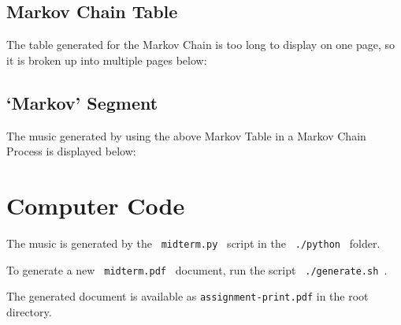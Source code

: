 \documentclass[10pt,letterpaper]{article}
\newcommand{\code}[1]{\colorbox{light-gray}{\texttt{#1}}}
\begin{document}


\subsection*{Markov Chain Table}
The table generated for the Markov Chain is too long to display on one page,
so it is broken up into multiple pages below:

\vspace*{24pt}







\restoregeometry{}

\subsection*{`Markov' Segment}
The music generated by using the above Markov Table in a Markov Chain Process
is displayed below:

\begin{quote}
{%
\parindent 0pt
\noindent
\ifx\preLilyPondExample \undefined
\else
  \expandafter\preLilyPondExample
\fi
%
\ifx\postLilyPondExample \undefined
\else
  \expandafter\postLilyPondExample
\fi
}
\end{quote}

\clearpage{}

\section*{Computer Code}
The music is generated by the \code{ midterm.py } script in the
\code{ ./python } folder.

To generate a new \code{ midterm.pdf } document, run the script
\code{ ./generate.sh  }.

The generated document is available as \code{assignment-print.pdf} in the
root directory.
\end{document}

